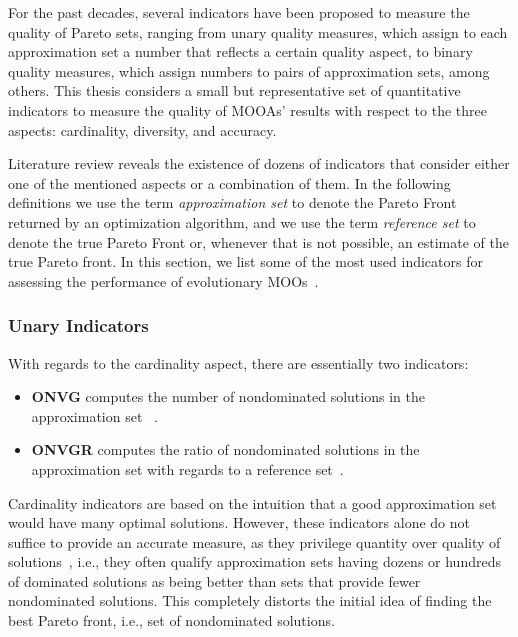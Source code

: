 	For the past decades, several indicators have been proposed to measure the quality of Pareto sets, ranging from unary quality measures, which assign to each approximation set a number that reflects a certain quality aspect, to binary quality measures, which assign numbers to pairs of approximation sets, among others. This thesis considers a small but representative set of quantitative indicators to measure the quality of \acp{MOOA}' results with respect to the three aspects: cardinality, diversity, and accuracy. 
	
	Literature review reveals the existence of dozens of indicators that consider either one of the mentioned aspects or a combination of them. In the following definitions we use the term \textit{approximation set} to denote the Pareto Front returned by an optimization algorithm, and we use the term \textit{reference set} to denote the true Pareto Front or, whenever that is not possible, an estimate of the true Pareto front. 
	In this section, we list some of the most used indicators for assessing the performance of evolutionary \acp{MOO}~\cite{Riquelme2015}. 
	
	
	\subsubsection{Unary Indicators}
	With regards to the cardinality aspect, there are essentially two indicators:
	\begin{itemize}
		\item \textbf{\ac{ONVG}} computes the number of nondominated solutions in the approximation set ~\cite{Veldhuizen1999GD}.
		\item \textbf{\ac{ONVGR}} computes the ratio of nondominated solutions in the approximation set with regards to a reference set~\cite{Veldhuizen1999GD}.
	\end{itemize}
	
	Cardinality indicators are based on the intuition that a good approximation set would have many optimal solutions. However, these indicators alone do not suffice to provide an accurate measure, as they privilege quantity over quality of solutions~\cite{Veldhuizen1999GD}, i.e., they often qualify approximation sets having dozens or hundreds of dominated solutions as being better than sets that provide fewer nondominated solutions. This completely distorts the initial idea of finding the best Pareto front, i.e., set of nondominated solutions.
	
